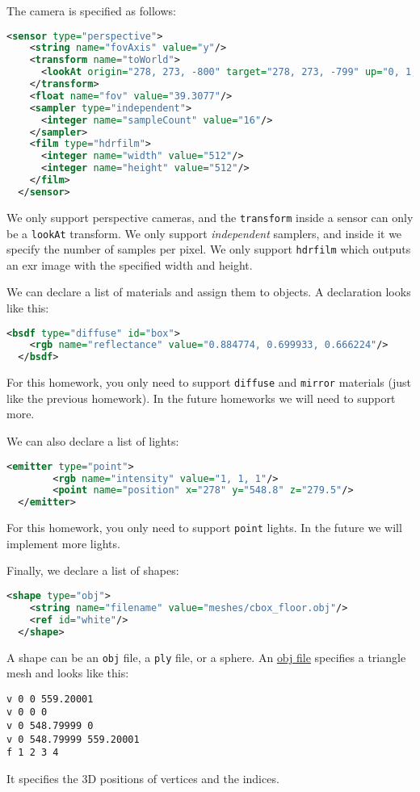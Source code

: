 The camera is specified as follows:
\begin{lstlisting}[language=xml]
  <sensor type="perspective">
    <string name="fovAxis" value="y"/>
    <transform name="toWorld">
      <lookAt origin="278, 273, -800" target="278, 273, -799" up="0, 1, 0"/>
    </transform>
    <float name="fov" value="39.3077"/>
    <sampler type="independent">
      <integer name="sampleCount" value="16"/>
    </sampler>
    <film type="hdrfilm">
      <integer name="width" value="512"/>
      <integer name="height" value="512"/>
    </film>
  </sensor>
\end{lstlisting}
We only support perspective cameras, and the \lstinline{transform} inside a sensor can only be a \lstinline{lookAt} transform. We only support \emph{independent} samplers, and inside it we specify the number of samples per pixel. We only support \lstinline{hdrfilm} which outputs an exr image with the specified width and height.

We can declare a list of materials and assign them to objects. A declaration looks like this:
\begin{lstlisting}[language=xml]
  <bsdf type="diffuse" id="box">
    <rgb name="reflectance" value="0.884774, 0.699933, 0.666224"/>
  </bsdf>
\end{lstlisting}
For this homework, you only need to support \lstinline{diffuse} and \lstinline{mirror} materials (just like the previous homework). In the future homeworks we will need to support more.

We can also declare a list of lights:
\begin{lstlisting}[language=xml]
  <emitter type="point">
        <rgb name="intensity" value="1, 1, 1"/>
        <point name="position" x="278" y="548.8" z="279.5"/>
  </emitter>
\end{lstlisting}
For this homework, you only need to support \lstinline{point} lights. In the future we will implement more lights.

Finally, we declare a list of shapes:
\begin{lstlisting}[language=xml]
  <shape type="obj">
    <string name="filename" value="meshes/cbox_floor.obj"/>
    <ref id="white"/>
  </shape>
\end{lstlisting}
A shape can be an \lstinline{obj} file, a \lstinline{ply} file, or a sphere. An \href{https://en.wikipedia.org/wiki/Wavefront_.obj_file}{obj file} specifies a triangle mesh and looks like this:
\begin{lstlisting}
v 0 0 559.20001
v 0 0 0
v 0 548.79999 0
v 0 548.79999 559.20001
f 1 2 3 4
\end{lstlisting}
It specifies the 3D positions of vertices and the indices.

